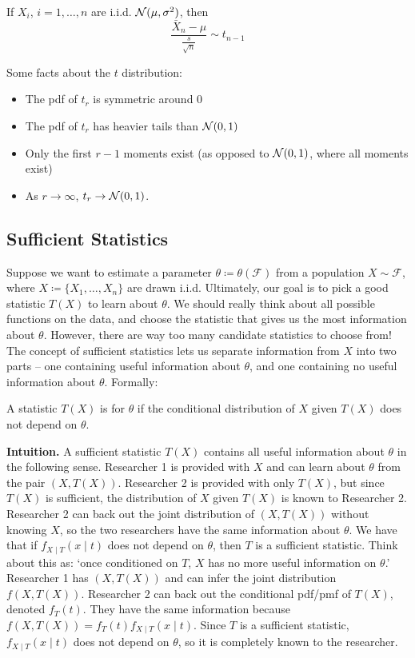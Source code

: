 \documentclass[10pt]{article}
\begin{document}
\begin{theorem}
	If $X_i$, $i = 1,\dots,n$ are i.i.d. $\mathcal{N}(\mu,\sigma^2)$, then
	\[
	\frac{\bar{X}_n - \mu}{\frac{s}{\sqrt{n}}} \sim t_{n-1}
	\]
\end{theorem}
\begin{remark}
	Some facts about the $t$ distribution:
	\begin{itemize}
		\item The pdf of $t_r$ is symmetric around 0
		\item The pdf of $t_r$ has heavier tails than $\mathcal{N}(0,1)$
		\item Only the first $r-1$ moments exist (as opposed to $\mathcal{N}(0,1)$, where all moments exist)
		\item As $r \to \infty$, $t_r \to \mathcal{N}(0,1)$.
	\end{itemize}
\end{remark}

\subsection{Sufficient Statistics}

Suppose we want to estimate a parameter $\theta \coloneqq \theta(\mathcal{F})$ from a population $X \sim \mathcal{F}$, where $X\coloneqq \{X_1,\dots,X_n\}$ are drawn i.i.d. Ultimately, our goal is to pick a good statistic $T(X)$ to learn about $\theta$. We should really think about all possible functions on the data, and choose the statistic that gives us the most information about $\theta$. However, there are way too many candidate statistics to choose from! The concept of sufficient statistics lets us separate information from $X$ into two parts -- one containing useful information about $\theta$, and one containing no useful information about $\theta$. Formally:

\begin{definition}
	A statistic $T(X)$ is  for $\theta$ if the conditional distribution of $X$ given $T(X)$ does not depend on $\theta$.
\end{definition}

\textbf{Intuition.} A sufficient statistic $T(X)$ contains all useful information about $\theta$ in the following sense. Researcher 1 is provided with $X$ and can learn about $\theta$ from the pair $(X,T(X))$. Researcher 2 is provided with only $T(X)$, but since $T(X)$ is sufficient, the distribution of $X$ given $T(X)$ is known to Researcher 2. Researcher 2 can back out the joint distribution of $(X,T(X))$ without knowing $X$, so the two researchers have the same information about $\theta$. We have that if $f_{X \mid T}(x \mid t)$ does not depend on $\theta$, then $T$ is a sufficient statistic. Think about this as: `once conditioned on $T$, $X$ has no more useful information on $\theta$.' Researcher 1 has $(X,T(X))$ and can infer the joint distribution $f(X,T(X))$. Researcher 2 can back out the conditional pdf/pmf of $T(X)$, denoted $f_T(t)$. They have the same information because $f(X,T(X)) = f_T(t) f_{X \mid T}(x \mid t)$. Since $T$ is a sufficient statistic, $f_{X \mid T}(x \mid t)$ does not depend on $\theta$, so it is completely known to the researcher. 
\end{document}
